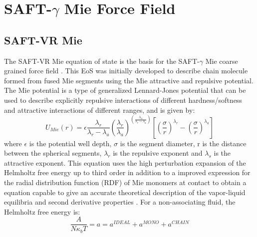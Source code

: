 
\chapter{SAFT-$\gamma$ Mie Force Field} %

\label{ChapterX} %


\section{SAFT-VR Mie}

The SAFT-VR Mie equation of state \cite{lafitte2013} is the basis for the SAFT-$\gamma$ Mie coarse grained force field \cite{avendano2011}. This EoS was initially developed to describe chain molecule formed from fused Mie segments using the Mie attractive and repulsive potential. The Mie potential is a type of generalized Lennard-Jones potential that can be used to describe explicitly repulsive interactions of different hardness/softness and attractive interactions of different ranges, and is given by:
\begin{equation}
U_{Mie}(r) = \epsilon\frac{\lambda_r}{\lambda_r - \lambda_a} \left(\frac{\lambda_r}{\lambda_a} \right)^{\left( \frac{\lambda_a}{\lambda_r - \lambda_a} \right)}
\left[ \left(\frac{\sigma}{r} \right)^{\lambda_r} - \left(\frac{\sigma}{r} \right)^{\lambda_a} \right]
\label{eqn:miepotential}
\end{equation}
where $\epsilon$ is the potential well depth, $\sigma$ is the segment diameter, r is the distance between the spherical segments, $\lambda_r$ is the repulsive exponent and $\lambda_s$ is the attractive exponent. This equation uses the  high perturbation expansion of the Helmholtz free energy up to third order in addition to a improved expression for the  radial distribution function (RDF) of Mie monomers at contact to obtain a equation capable to give an accurate theoretical description of the vapor-liquid equilibria and second derivative properties \cite{lafitte2013}. For a non-associating fluid, the Helmholtz free energy is:
\begin{equation}
\frac{A}{N\kappa_{b}T} = a = a^{IDEAL} + a^{MONO} + a^{CHAIN}
\label{eqn:miehelm}
\end{equation}

